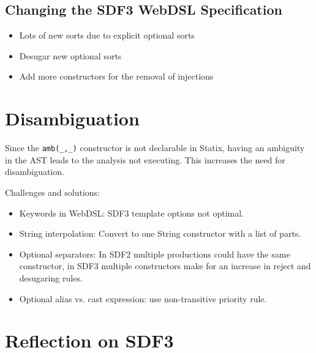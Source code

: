    \subsection{Changing the SDF3 WebDSL Specification}

      \begin{itemize}
        \item Lots of new sorts due to explicit optional sorts
        \item Desugar new optional sorts
        \item Add more constructors for the removal of injections
      \end{itemize}

  \section{Disambiguation}
  
    Since the \texttt{amb(\_,\_)} constructor is not declarable in Statix, having an ambiguity in the AST leads to the analysis not executing. This increases the need for disambiguation.

    Challenges and solutions:
    \begin{itemize}
      \item Keywords in WebDSL: SDF3 template options not optimal.
      \item String interpolation: Convert to one String constructor with a list of parts.
      \item Optional separators: In SDF2 multiple productions could have the same constructor, in SDF3 multiple constructors make for an increase in reject and desugaring rules.
      \item Optional alias vs. cast expression: use non-transitive priority rule.
    \end{itemize}

  \section{Reflection on SDF3}
